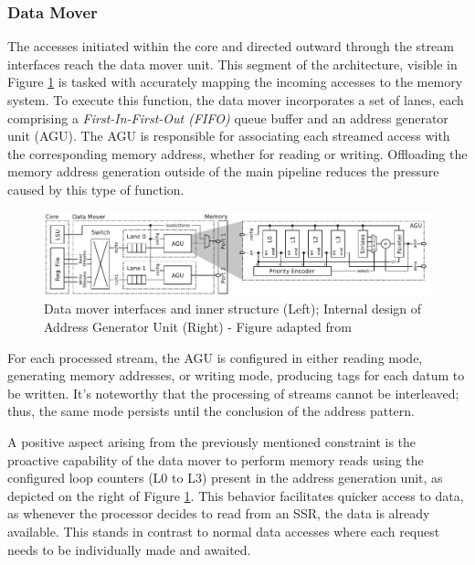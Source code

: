 \subsubsection{Data Mover}

The accesses initiated within the core and directed outward through the stream interfaces reach the data mover unit. This segment of the architecture, visible in Figure \ref{fig:ssr-data_mover} is tasked with accurately mapping the incoming accesses to the memory system. To execute this function, the data mover incorporates a set of lanes, each comprising a \textit{First-In-First-Out (FIFO)} queue buffer and an address generator unit (AGU). The AGU is responsible for associating each streamed access with the corresponding memory address, whether for reading or writing. Offloading the memory address generation outside of the main pipeline reduces the pressure caused by this type of function.

\begin{figure}[H]
	\begin{center}
 		\includegraphics[width=0.87\linewidth]{images/ssr-data_mover.pdf}
 		\caption{Data mover interfaces and inner structure (Left); Internal design of Address Generator Unit (Right) - Figure adapted from \cite{9068465}}
 		\label{fig:ssr-data_mover}
	\end{center} 
\end{figure}

For each processed stream, the AGU is configured in either reading mode, generating memory addresses, or writing mode, producing tags for each datum to be written. It's noteworthy that the processing of streams cannot be interleaved; thus, the same mode persists until the conclusion of the address pattern.

A positive aspect arising from the previously mentioned constraint is the proactive capability of the data mover to perform memory reads using the configured loop counters (L0 to L3) present in the address generation unit, as depicted on the right of Figure \ref{fig:ssr-data_mover}. This behavior facilitates quicker access to data, as whenever the processor decides to read from an SSR, the data is already available. This stands in contrast to normal data accesses where each request needs to be individually made and awaited.

